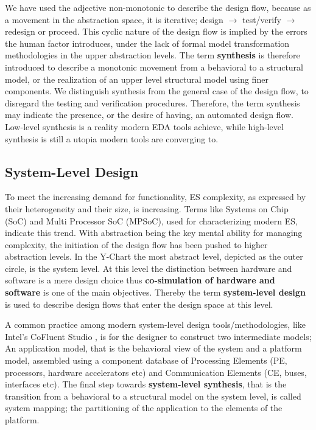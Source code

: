 \documentclass[12pt,twoside]{article}
\begin{document}
We have used the adjective non-monotonic to describe the design flow, because as a movement in the abstraction space, it is iterative; 
design $\rightarrow$ test/verify $\rightarrow$ redesign or proceed.
This cyclic nature of the design flow is implied by the errors the human factor introduces, under the lack of formal model transformation methodologies in the upper abstraction levels.
The term \textbf{synthesis} is therefore introduced to describe a monotonic movement from a behavioral to a structural model, or the realization of an upper level structural model using finer components.
We distinguish synthesis from the general case of the design flow, to disregard the testing and verification procedures.
Therefore, the term synthesis may indicate the presence, or the desire of having, an automated design flow.
Low-level synthesis is a reality modern EDA tools achieve, while high-level synthesis is still a utopia modern tools are converging to.


\subsection{System-Level Design}
\label{sec-3-3}
To meet the increasing demand for functionality, ES complexity, as expressed by their heterogeneity and their size, is increasing.
Terms like Systems on Chip (SoC) and Multi Processor SoC (MPSoC), used for characterizing modern ES, indicate this trend.
With abstraction being the key mental ability for managing complexity, the initiation of the design flow has been pushed to higher abstraction levels.
In the Y-Chart the most abstract level, depicted as the outer circle, is the system level.
At this level the distinction between hardware and software is a mere design choice thus \textbf{co-simulation of hardware and software} is one of the main objectives.
Thereby the term \textbf{system-level design} is used to describe design flows that enter the design space at this level.

A common practice among modern system-level design tools/methodologies, 
like Intel's CoFluent Studio \cite{citation}, 
is for the designer to construct two intermediate models;
An application model, that is the behavioral view of the system and 
a platform model, assembled using a component database of Processing Elements (PE, processors, hardware accelerators etc) and Communication Elements (CE, buses, interfaces etc).
The final step towards \textbf{system-level synthesis}, that is the transition from a behavioral to a structural model on the system level, is called system mapping;
the partitioning of the application to the elements of the platform.
\end{document}
